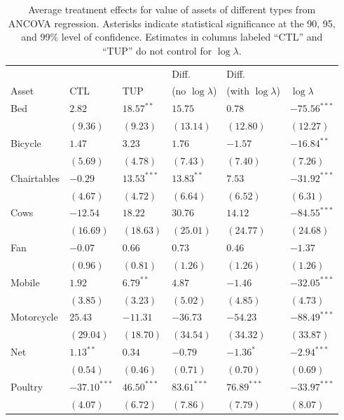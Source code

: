 \documentclass[12pt,letterpaper]{article}
\begin{document}
\begin{table}[htb]
\caption{\label{tab:orgtable3}
Average treatment effects for value of assets of different types from ANCOVA regression. Asterisks indicate statistical significance at the 90, 95, and 99\% level of confidence.  Estimates in columns labeled ``CTL'' and ``TUP'' do not control for \(\log\lambda\).}
\centering
\begin{tabular}{llllll}
 &  &  & Diff. & Diff. & \\
Asset & CTL & TUP & (no \(\log\lambda\)) & (with \(\log\lambda\)) & \(\log\lambda\)\\
\hline
Bed & \(2.82\) & \(18.57^{**}\) & \(15.75\) & \(0.78\) & \(-75.56^{***}\)\\
 & \((9.36)\) & \((9.23)\) & \((13.14)\) & \((12.80)\) & \((12.27)\)\\
Bicycle & \(1.47\) & \(3.23\) & \(1.76\) & \(-1.57\) & \(-16.84^{**}\)\\
 & \((5.69)\) & \((4.78)\) & \((7.43)\) & \((7.40)\) & \((7.26)\)\\
Chairtables & \(-0.29\) & \(13.53^{***}\) & \(13.83^{**}\) & \(7.53\) & \(-31.92^{***}\)\\
 & \((4.67)\) & \((4.72)\) & \((6.64)\) & \((6.52)\) & \((6.31)\)\\
Cows & \(-12.54\) & \(18.22\) & \(30.76\) & \(14.12\) & \(-84.55^{***}\)\\
 & \((16.69)\) & \((18.63)\) & \((25.01)\) & \((24.77)\) & \((24.68)\)\\
Fan & \(-0.07\) & \(0.66\) & \(0.73\) & \(0.46\) & \(-1.37\)\\
 & \((0.96)\) & \((0.81)\) & \((1.26)\) & \((1.26)\) & \((1.26)\)\\
Mobile & \(1.92\) & \(6.79^{**}\) & \(4.87\) & \(-1.46\) & \(-32.05^{***}\)\\
 & \((3.85)\) & \((3.23)\) & \((5.02)\) & \((4.85)\) & \((4.73)\)\\
Motorcycle & \(25.43\) & \(-11.31\) & \(-36.73\) & \(-54.23\) & \(-88.49^{***}\)\\
 & \((29.04)\) & \((18.70)\) & \((34.54)\) & \((34.32)\) & \((33.87)\)\\
Net & \(1.13^{**}\) & \(0.34\) & \(-0.79\) & \(-1.36^{*}\) & \(-2.94^{***}\)\\
 & \((0.54)\) & \((0.46)\) & \((0.71)\) & \((0.70)\) & \((0.69)\)\\
Poultry & \(-37.10^{***}\) & \(46.50^{***}\) & \(83.61^{***}\) & \(76.89^{***}\) & \(-33.97^{***}\)\\
 & \((4.07)\) & \((6.72)\) & \((7.86)\) & \((7.79)\) & \((8.07)\)\\

\end{tabular}
\end{table}
\end{document}
